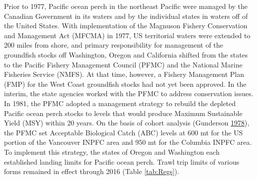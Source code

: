 \documentclass[12pt,]{article}
\begin{document}
Prior to 1977, Pacific ocean perch in the northeast Pacific were managed
by the Canadian Government in its waters and by the individual states in
waters off of the United States. With implementation of the Magnuson
Fishery Conservation and Management Act (MFCMA) in 1977, US territorial
waters were extended to 200 miles from shore, and primary responsibility
for management of the groundfish stocks off Washington, Oregon and
California shifted from the states to the Pacific Fishery Management
Council (PFMC) and the National Marine Fisheries Service (NMFS). At that
time, however, a Fishery Management Plan (FMP) for the West Coast
groundfish stocks had not yet been approved. In the interim, the state
agencies worked with the PFMC to address conservation issues. In 1981,
the PFMC adopted a management strategy to rebuild the depleted Pacific
ocean perch stocks to levels that would produce Maximum Sustainable
Yield (MSY) within 20 years. On the basis of cohort analysis (Gunderson
\protect\hyperlink{ref-gunderson_results_1978}{1978}), the PFMC set
Acceptable Biological Catch (ABC) levels at 600 mt for the US portion of
the Vancouver INPFC area and 950 mt for the Columbia INPFC area. To
implement this strategy, the states of Oregon and Washington each
established landing limits for Pacific ocean perch. Trawl trip limits of
various forms remained in effect through 2016 (Table \ref{tab:Regs}).
\end{document}
